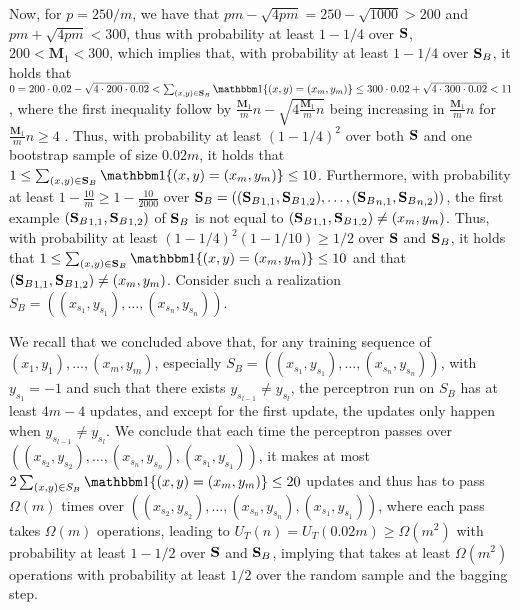 Now, for $p=250/m$, we have that $pm-\sqrt{4pm}=250-\sqrt{1000} > 200$ and $pm+\sqrt{4pm}<300$, thus with probability at least $1-1/4$ over $\mathbf{S}$, $200 < \mathbf{M}_{1} < 300$, which implies that, with probability at least $1-1/4$ over $\mathbf{S}_{B}$, it holds that $0=200\cdot 0.02-\sqrt{4\cdot 200 \cdot 0.02} < \sum_{(x,y) \in \rS_{B}} \ind\{(x,y) = (x_{m},y_{m})\} \leq 300\cdot 0.02+\sqrt{4\cdot 300 \cdot 0.02} < 11$, where the first inequality follow by $ \frac{\mathbf{M}_{1}}{m}n-\sqrt{4\frac{\mathbf{M}_{1}}{m}n} $ being increasing in $ \frac{\mathbf{M}_{1}}{m}n $ for $ \frac{\mathbf{M}_{1}}{m}n \geq  4$ . Thus, with probability at least $(1-1/4)^2$ over both $\mathbf{S}$ and one bootstrap sample of size $0.02m$, it holds that $1 \leq \sum_{(x,y) \in \rS_{B}} \ind\{(x,y) = (x_{m},y_{m})\} \leq 10$. Furthermore, with probability at least $1-\frac{10}{m} \geq 1-\frac{10}{2000}$ over $\mathbf{S}_{B} = (({\mathbf{S}_{B}}_{1,1}, {\mathbf{S}_{B}}_{1,2}), \ldots, ({\mathbf{S}_{B}}_{n,1}, {\mathbf{S}_{B}}_{n,2}))$, the first example $({\mathbf{S}_{B}}_{1,1}, {\mathbf{S}_{B}}_{1,2})$ of $\mathbf{S}_{B}$ is not equal to $({\mathbf{S}_{B}}_{1,1}, {\mathbf{S}_{B}}_{1,2}) \not= (x_{m}, y_{m})$. Thus, with probability at least $(1-1/4)^2(1-1/10) \geq 1/2$ over $\mathbf{S}$ and $\mathbf{S}_{B}$, it holds that $1 \leq \sum_{(x,y) \in \rS_{B}} \ind\{(x,y) = (x_{m},y_{m})\} \leq 10$ and that $({\mathbf{S}_{B}}_{1,1}, {\mathbf{S}_{B}}_{1,2}) \not= (x_{m}, y_{m})$. Consider such a realization $S_{B} = ((x_{s_{1}}, y_{s_{1}}), \ldots, (x_{s_{n}}, y_{s_{n}}))$. 

We recall that we concluded above that, for any training sequence of $(x_{1}, y_{1}), \ldots, (x_{m}, y_{m})$, especially $S_{B} = ((x_{s_{1}}, y_{s_{1}}), \ldots, (x_{s_{n}}, y_{s_{n}}))$, with $y_{s_{1}} = -1$ and such that there exists $y_{s_{l-1}} \not= y_{s_{l}}$, the perceptron run on $S_{B}$ has at least $4m-4$ updates, and except for the first update, the updates only happen when $y_{s_{l-1}} \not= y_{s_{l}}$. We conclude that each time the perceptron passes over $((x_{s_{2}}, y_{s_{2}}), \ldots, (x_{s_{n}}, y_{s_{n}}), (x_{s_{1}}, y_{s_{1}}))$, it makes at most $2\sum_{(x,y) \in S_{B}} \ind\{(x,y) = (x_{m}, y_{m})\} \leq 20$ updates and thus has to pass $\Omega(m)$ times over $((x_{s_{2}}, y_{s_{2}}), \ldots, (x_{s_{n}}, y_{s_{n}}), (x_{s_{1}}, y_{s_{1}}))$, where each pass takes $\Omega(m)$ operations, leading to $U_{T}(n)=U_{T}(0.02m) \geq \Omega(m^2)$ with probability at least $1-1/2$ over $\mathbf{S}$ and $\mathbf{S}_{B}$, implying that \cite{baggingoptimalPAClearner} takes at least $\Omega(m^{2})$ operations with probability at least $1/2$ over the random sample and the bagging step.

